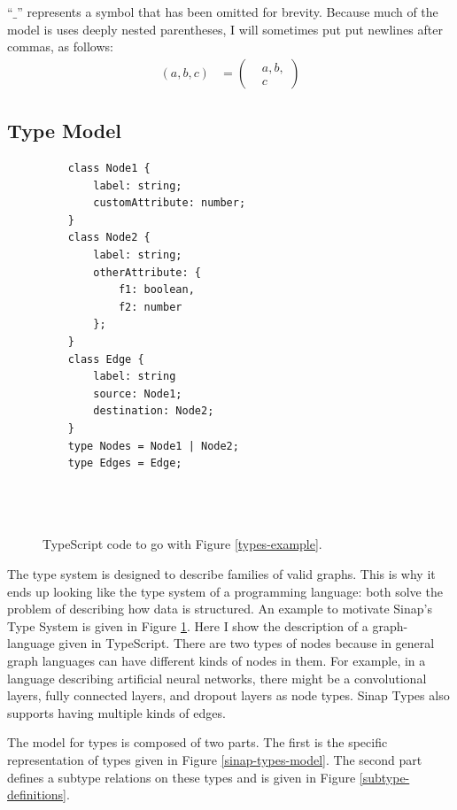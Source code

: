 \documentclass[12pt]{article}
\begin{document}
``\(\_\)'' represents a symbol that has been omitted for brevity. 
Because much of the model is uses deeply nested parentheses, 
I will sometimes put put newlines after commas, as follows:
\begin{align*}
    (a,b,c) &= \left(\begin{aligned}
        &a,b,\\&c
    \end{aligned}\right)
\end{align*}

\subsection{Type Model}
\begin{figure}
    \begin{mdframed}    
    \begin{multicols}{2}
    
    \begin{verbatim}
    class Node1 {
        label: string;
        customAttribute: number;
    }
    class Node2 {
        label: string;
        otherAttribute: {
            f1: boolean,
            f2: number
        };
    }
    class Edge {
        label: string
        source: Node1;
        destination: Node2;
    }
    type Nodes = Node1 | Node2;
    type Edges = Edge;

    
    
    \end{verbatim}
    \end{multicols}
    \end{mdframed}
    \caption{TypeScript code to go with Figure \ref{types-example}.}
    \label{types-example-code}
\end{figure}    

The type system is designed to describe families of valid graphs. 
This is why it ends up looking like the type system of a programming 
language: both solve the problem of describing how data is structured.
An example to motivate Sinap's Type System is given in Figure 
\ref{types-example-code}. Here I show the description of a graph-language
given in TypeScript. There are two types of nodes because 
in general graph languages can have different kinds of nodes in them. 
For example, in a language describing artificial neural networks, 
there might be a convolutional layers, fully connected layers, and 
dropout layers as node types. Sinap Types also supports having multiple
kinds of edges. 

The model for types is composed of two parts. The first is the 
specific representation of types given in Figure 
\ref{sinap-types-model}. The second part defines a subtype
relations on these types and is given in Figure \ref{subtype-definitions}.
\end{document}
